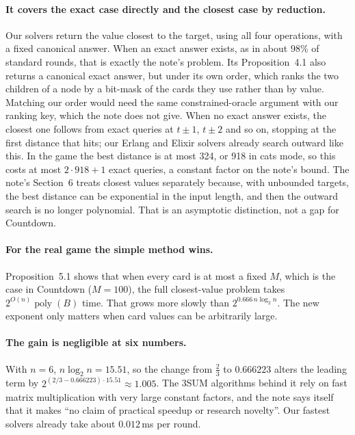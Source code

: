 \documentclass[11pt]{article}
\begin{document}
\paragraph{It covers the exact case directly and the closest case by reduction.}
Our solvers return the value closest to the target, using all four operations, with a fixed canonical
answer. When an exact answer exists, as in about 98\% of standard rounds, that is exactly the note's
problem. Its Proposition~4.1 also returns a canonical exact answer, but under its own order, which ranks
the two children of a node by a bit-mask of the cards they use rather than by value. Matching our order
would need the same constrained-oracle argument with our ranking key, which the note does not give. When
no exact answer exists, the closest one follows from exact queries at $t \pm 1$, $t \pm 2$ and so on,
stopping at the first distance that hits; our Erlang and Elixir solvers already search outward like
this. In the game the best distance is at most 324, or 918 in cats mode, so this costs at most
$2 \cdot 918 + 1$ exact queries, a constant factor on the note's bound. The note's Section~6 treats
closest values separately because, with unbounded targets, the best distance can be exponential in the
input length, and then the outward search is no longer polynomial. That is an asymptotic distinction,
not a gap for Countdown.

\paragraph{For the real game the simple method wins.}
Proposition~5.1 shows that when every card is at most a fixed $M$, which is the case in Countdown
($M = 100$), the full closest-value problem takes $2^{O(n)} \operatorname{poly}(B)$ time. That grows more
slowly than $2^{0.666\, n \log_2 n}$. The new exponent only matters when card values can be arbitrarily
large.

\paragraph{The gain is negligible at six numbers.}
With $n = 6$, $n \log_2 n = 15.51$, so the change from $\tfrac23$ to $0.666223$ alters the leading term by
$2^{(2/3 - 0.666223) \cdot 15.51} \approx 1.005$. The 3SUM algorithms behind it rely on fast matrix
multiplication with very large constant factors, and the note says itself that it makes ``no claim of
practical speedup or research novelty''. Our fastest solvers already take about $0.012$\,ms per round.
\end{document}
